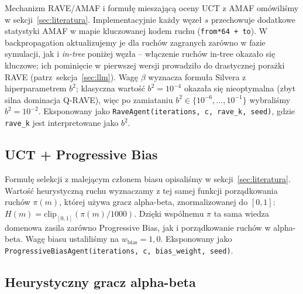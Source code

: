 Mechanizm RAVE/AMAF i formułę mieszającą oceny UCT z AMAF omówiliśmy
w sekcji~\ref{sec:literatura}. Implementacyjnie każdy węzeł $s$ przechowuje
dodatkowe statystyki AMAF w mapie kluczowanej kodem ruchu (\texttt{from*64 + to}).
W backpropagation aktualizujemy je dla ruchów zagranych zarówno w fazie
symulacji, jak i \emph{in-tree} poniżej węzła -- włączenie ruchów in-tree
okazało się kluczowe; ich pominięcie w pierwszej wersji prowadziło do
drastycznej porażki RAVE (patrz~sekcja~\ref{sec:llm}). Wagę $\beta$ wyznacza
formuła Silvera z hiperparametrem $b^2$; klasyczna wartość $b^2 = 10^{-4}$
okazała się nieoptymalna (zbyt silna dominacja Q-RAVE), więc po zamiataniu
$b^2 \in \{10^{-6}, \ldots, 10^{-1}\}$ wybraliśmy $b^2 = 10^{-2}$. Eksponowany
jako \texttt{RaveAgent(iterations, c, rave\_k, seed)}, gdzie \texttt{rave\_k}
jest interpretowane jako $b^2$.

\subsection{UCT + Progressive Bias}

Formułę selekcji z malejącym członem biasu opisaliśmy w sekcji~\ref{sec:literatura}.
Wartość heurystyczną ruchu wyznaczamy z tej samej funkcji porządkowania ruchów
$\pi(m)$, której używa gracz alpha-beta, znormalizowanej do $[0,1]$:
$H(m) = \mathrm{clip}_{[0,1]}(\pi(m)/1000)$. Dzięki wspólnemu $\pi$ ta sama wiedza
domenowa zasila zarówno Progressive Bias, jak i porządkowanie ruchów w alpha-beta.
Wagę biasu ustaliliśmy na $w_{\text{bias}} = 1{,}0$. Eksponowany jako
\texttt{ProgressiveBiasAgent(iterations, c, bias\_weight, seed)}.

\subsection{Heurystyczny gracz alpha-beta}

